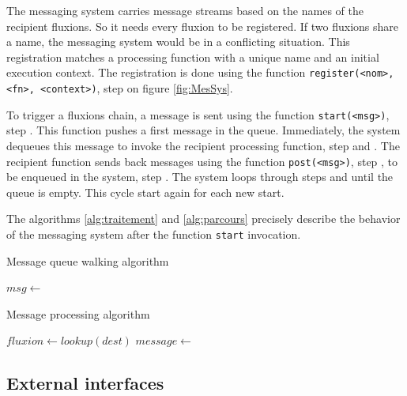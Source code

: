 The messaging system carries message streams based on the names of the recipient fluxions.
So it needs every fluxion to be registered.
If two fluxions share a name, the messaging system would be in a conflicting situation.
This registration matches a processing function with a unique name and an initial execution context.
The registration is done using the function \texttt{register(<nom>, <fn>, <context>)}, step  on figure \ref{fig:MesSys}.

To trigger a fluxions chain, a message is sent using the function \texttt{start(<msg>)}, step .
This function pushes a first message in the queue.
Immediately, the system dequeues this message to invoke the recipient processing function, step  and .
The recipient function sends back messages using the function \texttt{post(<msg>)}, step , to be enqueued in the system, step .
The system loops through steps  and  until the queue is empty.
This cycle start again for each new start.

The algorithms \ref{alg:traitement} and \ref{alg:parcours} precisely describe the behavior of the messaging system after the function \texttt{start} invocation.

\begin{algorithm}
\caption{Message queue walking algorithm}
\label{alg:parcours}
\begin{algorithmic}
\State $msg \gets$  
\State {}
\EndWhile
\EndFunction
\end{algorithmic}
\end{algorithm}

\begin{algorithm}
\caption{Message processing algorithm}
\label{alg:traitement}
\begin{algorithmic}
\State $fluxion \gets lookup(dest)$
\State $message \gets$  
\State {} 
\EndFor
\EndFunction
\end{algorithmic}
\end{algorithm}

\subsection{External interfaces}

